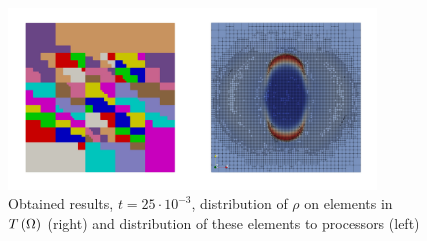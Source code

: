 \begin{figure}[H]
	\begin{center}
		\includegraphics[width=0.87\textwidth]{img/mhd-blast/old/mya6.jpg}
	\caption{Obtained results, $t = 25\cdot 10^{-3}$, distribution of $\rho$ on elements in $T\left(\Omega\right)$ (right) and distribution of these elements to processors (left)}
	\label{figure:blastOldMyAdapt6}
	\end{center}
\end{figure}
\vspace{-8mm}

